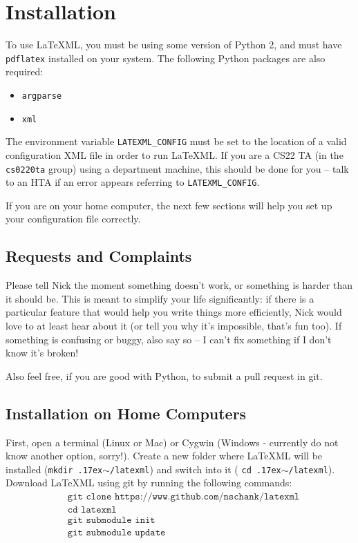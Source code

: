 \section{Installation}
  To use \LaTeX ML, you must be using some version of Python 2, and must have 
  \texttt{pdflatex} installed on your system. The following Python packages are 
  also required:
  
  \begin{itemize}\itemsep0pt
    \item \texttt{argparse}
    \item \texttt{xml}
  \end{itemize}
  
  The environment variable \texttt{LATEXML\_CONFIG} must be set to the location 
  of a valid configuration XML file in order to run \LaTeX ML. If you are a CS22
  TA (in the \texttt{cs0220ta} group) using a department machine, this should be
  done for you -- talk to an HTA if an error appears referring to 
  \texttt{LATEXML\_CONFIG}.
  
  If you are on your home computer, the next few sections will help you set up 
  your configuration file correctly.
  
  \subsection{Requests and Complaints}
    Please tell Nick the moment something doesn't work, or something is harder
    than it should be. This is meant to simplify your life significantly: if
    there is a particular feature that would help you write things more 
    efficiently, Nick would love to at least hear about it (or tell you 
    why it's impossible, that's fun too). If something is confusing or 
    buggy, also say so -- I can't fix something if I don't know it's broken!
    
    Also feel free, if you are good with Python, to submit a pull request 
    in git.
    
  \subsection{Installation on Home Computers}  
    \newcommand\mytilde{\raise.17ex\hbox{$\scriptstyle\sim$}}
    \newcommand\ttquote{\texttt{\char`\"}}
  
    First, open a terminal (Linux or Mac) or Cygwin (Windows - currently do not
    know another option, sorry!). Create a new folder where \LaTeX ML will 
    be installed (\texttt{mkdir \mytilde/latexml}) and switch into it (
    \texttt{cd \mytilde/latexml}). Download \LaTeX ML using git by running
    the following commands:
    \begin{align*}
      &\texttt{git clone https://www.github.com/nschank/latexml}\\
      &\texttt{cd latexml}\\
      &\texttt{git submodule init}\\
      &\texttt{git submodule update}
    \end{align*}
    

